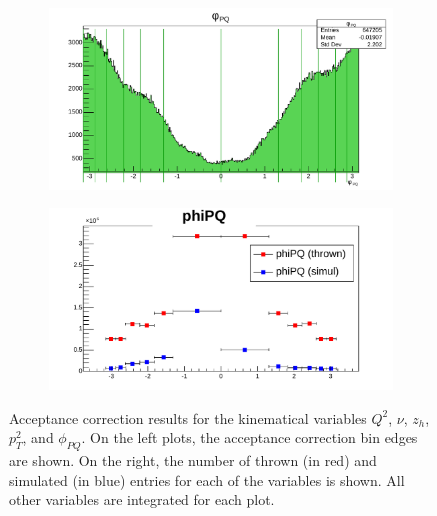 \begin{figure}[hbtp]
        \begin{subfigure}{.5\textwidth}
            \centering
            \includegraphics[width=\linewidth]{13dataanalysis/img/40_accbins_phipq.pdf}
            \label{fig::acc_corr_bins_phipq}
        \end{subfigure}
        \begin{subfigure}{.5\textwidth}
            \centering
            \includegraphics[width=\linewidth]{13dataanalysis/img/40_acccorr_phipq.pdf}
            \label{fig::acc_corr_phipq}
        \end{subfigure}

        \caption[Acceptance correction results.]{Acceptance correction results for the kinematical variables $Q^2$, $\nu$, $z_h$, $p_T^2$, and $\phi_{PQ}$. On the left plots, the acceptance correction bin edges are shown. On the right, the number of thrown (in red) and simulated (in blue) entries for each of the variables is shown. All other variables are integrated for each plot.}
        \label{fig::acc_corr}
    \end{figure}
